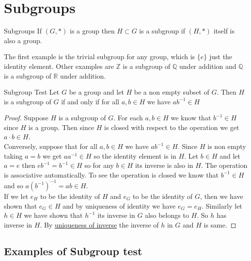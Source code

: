 \documentclass[16pt,a4paper]{article}
\theoremstyle{definition}
\begin{document}
\newpage

\section{Subgroups}

\begin{defn}{Subgroups}{}
If $(G,\ast)$ is a group then $H\subset G$ is a subgroup if $(H,\ast)$ itself is also a group. 
\end{defn}
The first example is the trivial subgroup for any group, which is $\{e\}$ just the identity element. Other examples are $\mathbb{Z}$ is a subgroup of $\mathbb{Q}$ under addition and $\mathbb{Q}$ is a subgroup of $\mathbb{R}$ under addition. 

\begin{thm}{Subgroup Test}{}
Let $G$ be a group and let $H$ be a non empty subset of $G$. Then $H$ is a subgroup of $G$ if and only if for all $a,b\in H$ we have $ab^{-1}\in H$
\end{thm}\label{test}


\begin{proof}

Suppose $H$ is a subgroup of $G$. For each $a,b\in H$ we know that $b^{-1}\in H$ since $H$ is a group. Then since $H$ is closed with respect to the operation we get $a\cdot b \in H$. \\

Conversely, suppose that for all $a,b \in H$ we have $ab^{-1}\in H$. Since $H$ is non empty taking $a=b$ we get $aa^{-1}\in H$ so the identity element is in $H$. Let $b\in H$ and let $a=e$ then $eb^{-1}=b^{-1}\in H$ so for any $b\in H$ its inverse is also in $H$. The operation is associative automatically. To see the operation is closed  we know that $b^{-1}\in H$ and so $a({b^{-1}})^{-1}=ab\in H$. 
\\

If we let $e_H$ to be the identity of $H$ and $e_G$ to be the identity of $G$, then we have shown that $e_G\in H$ and by uniqueness of identity we have $e_G = e_H$.  Similarly let $h\in H$ we have shown that $h^{-1}$ its inverse in $G$ also belongs to $H$. So $h$ has inverse in $H$. By \hyperref[uniq-inv]{uniqueness of inverse} the inverse of $h$ in $G$ and $H$ is same.   
\end{proof}

\subsection{Examples of Subgroup test}
\end{document}
